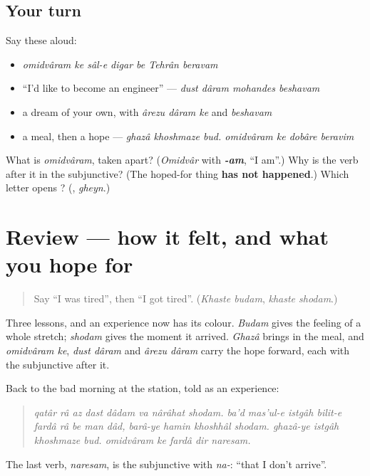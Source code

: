 \subsection*{Your turn}
Say these aloud:

\begin{itemize}
\raggedright
  \item \emph{omidvâram ke sâl-e digar be Tehrân beravam}
  \item \textquotedblleft{}I'd like to become an engineer\textquotedblright{} — \emph{dust dâram mohandes beshavam}
  \item a dream of your own, with \emph{ârezu dâram ke} and \emph{beshavam}
  \item a meal, then a hope — \emph{ghazâ khoshmaze bud. omidvâram ke dobâre beravim}
\end{itemize}

\begin{tcolorbox}[breakable,colback=teal!4,colframe=teal!35!black,title={Before you move on}]
What is \emph{omidvâram}, taken apart? (\emph{Omidvâr} with \emph{\textbf{-am}}, \textquotedblleft{}I am\textquotedblright{}.) Why is the verb after it in the subjunctive? (The hoped-for thing \textbf{has not happened}.) Which letter opens \textbf{}? (\textbf{}, \emph{gheyn}.)
\end{tcolorbox}
\section[(review)]{Review — how it felt, and what you hope for}

\label{lesson:FA-R296-feelings-and-hopes}



\begin{quote}
Say \textquotedblleft{}I was tired\textquotedblright{}, then \textquotedblleft{}I got tired\textquotedblright{}. (\emph{Khaste budam}, \emph{khaste shodam}.)
\end{quote}

\begin{grammarlens}[title={What you've built}]
Three lessons, and an experience now has its colour. \emph{Budam} gives the feeling of a whole stretch; \emph{shodam} gives the moment it arrived. \emph{Ghazâ} brings in the meal, and \emph{omidvâram ke}, \emph{dust dâram} and \emph{ârezu dâram} carry the hope forward, each with the subjunctive after it.

Back to the bad morning at the station, told as an experience:

\begin{quote}
\emph{qatâr râ az dast dâdam va nârâhat shodam. ba'd mas'ul-e istgâh bilit-e fardâ râ be man dâd, barâ-ye hamin khoshhâl shodam. ghazâ-ye istgâh khoshmaze bud. omidvâram ke fardâ dir naresam.}
\end{quote}

The last verb, \emph{naresam}, is the subjunctive with \emph{na-}: \textquotedblleft{}that I don't arrive\textquotedblright{}.
\end{grammarlens}

